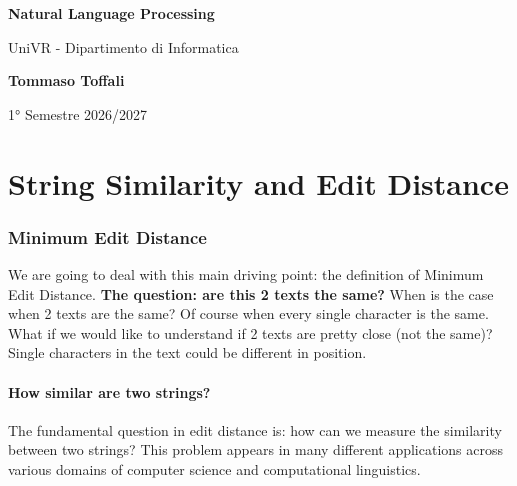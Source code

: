 \documentclass[a4paper]{article}
\theoremstyle{definition}
\begin{document}
\begin{titlepage}
	\begin{center}
		\vspace*{1cm}

		\Huge
		\textbf{Natural Language Processing}

		\vspace{0.5cm}
		\LARGE
		UniVR - Dipartimento di Informatica

		\vspace{1.5cm}

		\textbf{Tommaso Toffali}

		\vfill


		\vspace{0.8cm}


		1° Semestre 2026/2027
    \end{center}
\end{titlepage}

\tableofcontents
\pagebreak

\part{String Similarity and Edit Distance}
\section{Minimum Edit Distance}
We are going to deal with this main driving point: the definition of Minimum Edit Distance.
\vspace{1em}
\noindent
\newline
\textbf{The question: are this 2 texts the same?}
\vspace{1em}
\noindent
\newline
When is the case when 2 texts are the same? Of course when every single character is the same.
What if we would like to understand if 2 texts are pretty close (not the same)?
\vspace{1em}
\noindent
\newline
Single characters in the text could be different in position.
\subsection{How similar are two strings?}
The fundamental question in edit distance is: how can we measure the similarity between two 
strings? This problem appears in many different applications across various domains of computer 
science and computational linguistics.
\end{document}
